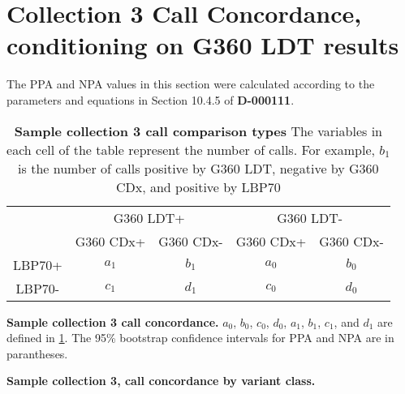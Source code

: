 \section{Collection 3 Call Concordance, conditioning on G360 LDT results}
\label{a:call_concordance_tables}

The PPA and NPA values in this section were calculated according to the
parameters and equations in Section 10.4.5 of \textbf{D-000111}.

 \captionsetup{width=.65\textwidth}
 \begin{table}[H]
 \centering
 \begin{tabular}{cc|c|c|c}
 	   & \multicolumn{2}{c|}{G360 LDT+} & \multicolumn{2}{c}{G360 LDT-} \\
       & G360 CDx+ & G360 CDx- & G360 CDx+ & G360 CDx- \\ \cline{2-5}
      LBP70+ & $a_1$ & $b_1$ & $a_0$ & $b_0$ \\ \cline{2-5}
      LBP70- & $c_1$ & $d_1$ & $c_0$ & $d_0$ \\
 \end{tabular}
 \caption[Sample collection 3 call comparison types]
 {\textbf{Sample collection 3 call comparison types} The variables
 in each cell of the table represent the number of calls. For example,
 $b_1$ is the number of calls positive by G360 LDT, negative by G360 CDx, and positive
 by LBP70}
 \label{t:collection3_concordance_types}
 \end{table}

 \captionsetup{width=.9\textwidth}
 \begin{table}[H]
 \centering
 \footnotesize
 
 \caption[Sample collection 3 call concordance]
 {\textbf{Sample collection 3 call concordance.}
 $a_0$, $b_0$, $c_0$, $d_0$, $a_1$, $b_1$, $c_1$, and $d_1$ are defined in
 \cref{t:collection3_concordance_types}. The 95\% bootstrap confidence intervals 
  for PPA and NPA are in parantheses.}
 \label{t:coll3_variant_category_cond_bootstrap_3test}
 \end{table}

 \captionsetup{width=.95\textwidth}
 \begin{table}[H]
 \footnotesize
 \centering
 
 \caption[Sample collection 3, call concordance by variant class]
 {\textbf{Sample collection 3, call concordance by variant class.}}
 \label{t:coll3_variant_classspecial_cond_bootstrap_3test}
 \end{table}